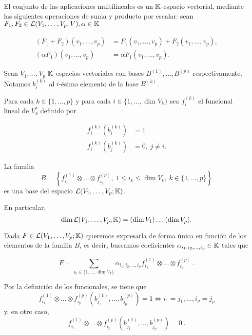 \examplee

\remb

El conjunto de las aplicaciones multilineales es un \(\mathbb{K}\)-espacio
vectorial, mediante las siguientes operaciones de suma y producto por
escalar: sean \(F_1, F_2\in \mathcal{L}(V_1,\dots,V_p;V),\alpha\in\mathbb{K}\)

\begin{align*}
(F_1+F_2)(v_1,\dots,v_p)&=F_1(v_1,\dots,v_p)+F_2(v_1,\dots,v_p),\\
(\alpha F_1)(v_1,\dots,v_p)&=\alpha F_1(v_1,\dots,v_p).
\end{align*}

\reme

\propb
\label{prop:base-funcionales} Sean \(V_1,\dots,V_p\) \(\mathbb{K}\)-espacios
vectoriales con bases \(B^{(1)},\dots,B^{(p)}\) respectivamente. Notamos
\(b_i^{(k)}\) al \(i\)-ésimo elemento de la base \(B^{(k)}\).

Para cada \(k\in\{1,\dots,p\}\) y para cada \(i\in\{1,\dots,\dim V_k\}\)
sea \(f_{i}^{(k)}\) el funcional lineal de \(V_k^{*}\) definido por

\begin{align*}
    f_{i}^{(k)}(b_i^{(k)})&=1\\
    f_{i}^{(k)}(b_j^{(k)})&=0,\ j\neq i.
\end{align*}

La familia
\[B=\left\{f_{i_1}^{(1)}\otimes\dots\otimes f_{i_p}^{(p)},\ 1\leq i_k\leq\dim{V_k},\ k\in\{1,\dots,p\}\right\}\]
es una base del espacio \(\mathcal{L}(V_1,\dots, V_p;\mathbb{K})\).

En particular,
\[\dim\mathcal{L}(V_1,\dots, V_p;\mathbb{K})=(\dim V_1)\dots (\dim V_p).\]

\proofb

Dada \(F\in \mathcal{L}(V_1,\dots, V_p;\mathbb{K})\) queremos expresarla de forma única
en función de los elementos de la familia \(B\), es decir, buscamos
coeficientes \(\alpha_{i_1,i_2,\dots,i_p}\in\mathbb{K}\) tales que

\begin{equation}
  \label{eq:basetensor}
  F=\sum\limits_{i_k\in\{1,\dots,\dim V_k\}} \alpha_{i_1,i_2,\dots,i_p}f_{i_1}^{(1)}\otimes\dots\otimes f_{i_p}^{(p)}\ .
\end{equation}

Por la definición de los funcionales, se tiene que
\begin{equation}
  \label{eq:evalbasetensor}
  f_{i_1}^{(1)}\otimes\dots\otimes f_{i_p}^{(p)}\left(b_{j_1}^{(1)},\dots,b_{j_p}^{(p)}\right)=1\Leftrightarrow i_1=j_1,\dots,i_p=j_p
\end{equation}
y, en otro caso,
\[f_{i_1}^{(1)}\otimes\dots\otimes f_{i_p}^{(p)}\left(b_{j_1}^{(1)},\dots,b_{j_p}^{(p)}\right)=0\ .\]

